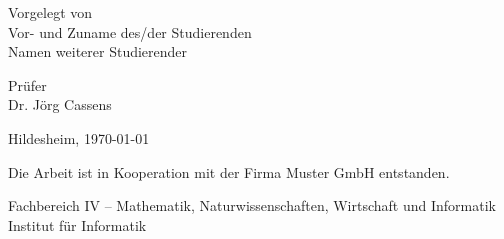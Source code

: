 \documentclass[12pt,        %
  english,ngerman,          %
  paper=a4,                 %
  captions=tablesignature,  %
  listof=numbered,          %
  bibliography=totoc,       %
  headings=small,           %
  headinclude=false,        %
  footinclude=false,        %
  parskip=half-,            %
  oneside,                  %
  BCOR=5mm,                 %
  DIV=12                    %
  ]{scrbook}                %
\begin{document}
\begin{titlepage}
\begin{center}
{      \vfill

      Vorgelegt von\\
      Vor- und Zuname des/der Studierenden\\
      Namen weiterer Studierender

      \vfill

      Prüfer\\
      Dr. Jörg Cassens
  
      \vfill
      
      Hildesheim, \today
    }
      
      \vfill
      
    {
      \footnotesize 

      Die Arbeit ist in Kooperation mit der Firma Muster GmbH entstanden.

      \vfill

      Fachbereich IV -- Mathematik, Naturwissenschaften, Wirtschaft und Informatik\\      
      Institut für Informatik
    }
  \end{center}
\end{titlepage}

\end{document}
